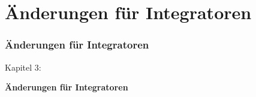 %

\section{Änderungen für Integratoren}
\begin{frame}[fragile]
	\frametitle{Änderungen für Integratoren}

	\begin{center}\huge{Kapitel 3:}\end{center}
	\begin{center}\huge{\color{typo3darkgrey}\textbf{Änderungen für Integratoren}}\end{center}

\end{frame}

